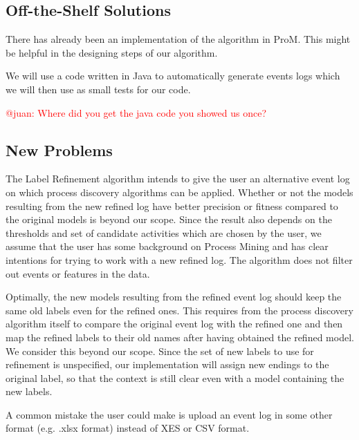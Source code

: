 \documentclass[notitlepage]{article}
\begin{document}
\begin{flushleft}
\subsection{Off-the-Shelf Solutions}
There has already been an implementation of the algorithm in ProM.
This might be helpful in the designing steps of our algorithm.

We will use a code written in Java to automatically generate events logs which we will then use as small tests for our code.

\textcolor{red}{@juan: Where did you get the java code you showed us once?}

\subsection{New Problems}
The Label Refinement algorithm intends to give the user an alternative event log on which process discovery algorithms can be applied.
Whether or not the models resulting from the new refined log have better precision or fitness compared to the original models is beyond our scope.
Since the result also depends on the thresholds and set of candidate activities which are chosen by the user, we assume that the user has some background on Process Mining and has clear intentions for trying to work with a new refined log.
The algorithm does not filter out events or features in the data.

Optimally, the new models resulting from the refined event log should keep the same old labels even for the refined ones.
This requires from the process discovery algorithm itself to compare the original event log with the refined one and then map the refined labels to their old names after having obtained the refined model.
We consider this beyond our scope.
Since the set of new labels to use for refinement is unspecified, our implementation will assign new endings to the original label, so that the context is still clear even with a model containing the new labels.

A common mistake the user could make is upload an event log in some other format (e.g. .xlsx format) instead of XES or CSV format.





\end{flushleft}
\end{document}
